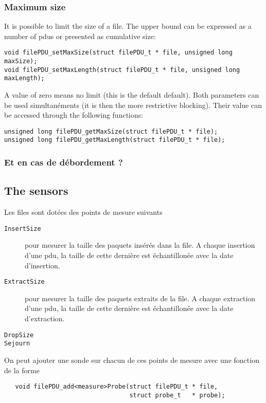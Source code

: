 %
\subsubsection{Maximum size}

   It is possible to limit the size of a file. The upper bound
can be expressed as a number of {\sc pdu}s or presented as 
cumulative size:

\begin{verbatim}
void filePDU_setMaxSize(struct filePDU_t * file, unsigned long maxSize);
void filePDU_setMaxLength(struct filePDU_t * file, unsigned long maxLength);
\end{verbatim}

   A value of zero means no limit (this is the default
default). Both parameters can be used simultanéments
(it is then the more restrictive blocking). Their value can be
accessed through the following functions:

\begin{verbatim}
unsigned long filePDU_getMaxSize(struct filePDU_t * file);
unsigned long filePDU_getMaxLength(struct filePDU_t * file);
\end{verbatim}

%
\subsubsection{Et en cas de débordement ?}

%
\subsection{The sensors}

   Les files sont dotées des points de mesure suivants

\begin{description}
   \item[{\tt InsertSize}] pour mesurer la taille des paquets insérés
     dans la file. A chaque insertion d'une {\sc pdu}, la taille de
     cette dernière est échantillonée avec la date d'insertion.
   \item[{\tt ExtractSize}] pour mesurer la taille des paquets extraits
     de la file. A chaque extraction d'une {\sc pdu}, la taille de
     cette dernière est échantillonée avec la date d'extraction.
   \item[{\tt DropSize}]
   \item[{\tt Sejourn}]
\end{description}

   On peut ajouter une sonde sur chacun de ces points de mesure avec
une fonction de la forme

\begin{verbatim}
   void filePDU_add<measure>Probe(struct filePDU_t * file,
                                  struct probe_t   * probe);
\end{verbatim}

